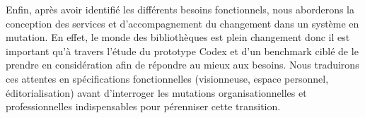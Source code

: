Enfin, après avoir identifié les différents besoins fonctionnels, nous aborderons la conception des services et d’accompagnement du changement dans un système en mutation. En effet, le monde des bibliothèques est plein changement donc il est important qu'à travers l’étude du prototype Codex et d'un benchmark ciblé de le prendre en considération afin de répondre au mieux aux besoins. Nous traduirons ces attentes en spécifications fonctionnelles (visionneuse, espace personnel, éditorialisation) avant d’interroger les mutations organisationnelles et professionnelles indispensables pour pérenniser cette transition.